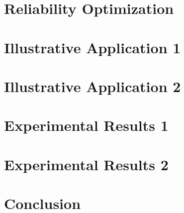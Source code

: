 \section{Reliability Optimization}

\section{Illustrative Application 1}

\section{Illustrative Application 2}

\section{Experimental Results 1}

\section{Experimental Results 2}

\section{Conclusion}
